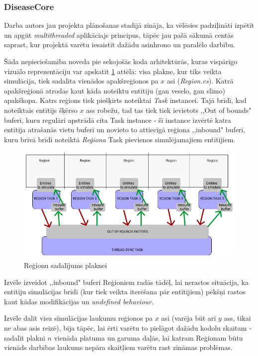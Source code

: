 \subsubsection{DiseaseCore}

Darba autors jau projekta plānošanas stadijā zināja, ka vēlēsies padziļināti
izpētīt un apgūt \emph{multithreaded} aplikāciajs principus, tāpēc jau pašā sākumā
centās saprast, kur projektā varētu iesaistīt dažādu asinhrono un paralēlo darbību.

Šāda nepieciešamība noveda pie sekojošās koda arhitektūrās, kuras vispārīgo
vizuālo reprezentāciju var apskatīt \ref{img:multithreaded-layout} attēlā: visa plakne, kur tiks
veikta simulācija, tiek sadalīta vienādos apakšreģionos pa \(x\) asi (\emph{Region.cs}).
Katrā apakšreģionā atrodas kaut kāda noteiktu entītiju (gan veselo, gan slimo) apakškopa.
Katrs reģions tiek piešķirts noteiktai \emph{Task}\cite{csharp:task} instancei.
Tajā brīdī, kad noteiktais entītijs šķērso \(x\) ass robežu, tad tas tiek tiek
ievietots ,,Out of bounds" buferī, kuru regulāri apstrādā cita Task instance - šī instance
izvērtē katra entītija atrašanās vietu buferī un novieto to attiecīgā reģiona
,,inbound" buferī, kuru brīvā brīdī noteiktā \emph{Reģiona} Task pievienos
simulējamajiem entītijiem.


\begin{figure}[H]
	\centering
	\includegraphics[scale=0.5]{images/multithreaded-layout.png}
	\caption{Reģionu sadalījums plaknei}
	\label{img:multithreaded-layout}
\end{figure}


Izvēle izveidot ,,inbound" buferi Reģioniem radās tādēļ, lai nerastos situācija,
ka entītiju simulācijas brīdī (kur tiek veikta iterēšana pār entītijiem) pēkšņi
rastos kaut kādas modifikācijas un \emph{undefined behaviour}.

Izvēle dalīt visu simulācijas laukumu reģionos pa \(x\) asi (varēja būt arī \(y\)
ass, tikai ne abas asis reizē), bija tāpēc, lai ērti varētu to pielāgot dažādu
kodolu skaitam -  sadalīt plakni \(n\) vienāda platuma un garuma daļās, lai
katram Reģionam būtu vienāds darbības laukums nepāra skaitļiem varētu rast zināmas problēmas.

